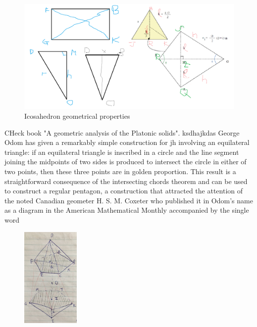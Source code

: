 \begin{figure}[h]
\centering
	\includegraphics[width=\textwidth]{image/icosaGeo3.png}
%	
	\caption{Icosahedron geometrical properties}
	\label{fig:icosaGeo2}
\end{figure}

 CHeck book "A geometric analysis of the Platonic solids". ksdhajkdas
George Odom has given a remarkably simple construction for jh involving an equilateral triangle: if an equilateral triangle is inscribed in a circle and the line segment joining the midpoints of two sides is produced to intersect the circle in either of two points, then these three points are in golden proportion. This result is a straightforward consequence of the intersecting chords theorem and can be used to construct a regular pentagon, a construction that attracted the attention of the noted Canadian geometer H. S. M. Coxeter who published it in Odom's name as a diagram in the American Mathematical Monthly accompanied by the single word 

\begin{figure} %
    \centering
    \includegraphics[width=0.25\textwidth]{image/icosaGeo4.png}
\end{figure}

